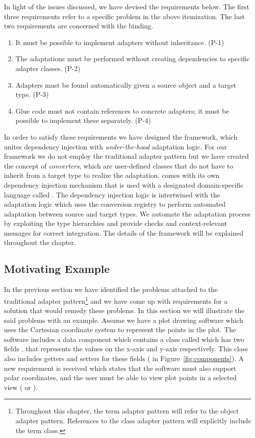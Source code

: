 In light of the issues discussed, we have devised the requirements below. The first three requirements refer to a specific problem in the above itemization. The last two requirements are concerned with the binding.

\begin{enumerate}[{R}-1]
\item It must be possible to implement adapters without inheritance. (P-1)
\item The adaptations must be performed without creating dependencies to specific adapter classes. (P-2)
\item Adapters must be found automatically given a source object and a target type. (P-3)
\item Glue code must not contain references to concrete adapters; it must be possible to implement these separately. (P-4)
\end{enumerate}

In order to satisfy these requirements we have designed the \zamk framework, which unites dependency injection with \emph{under-the-hood} adaptation logic.
For our framework we do not employ the traditional adapter pattern but we have created the concept of \emph{converters}, which are user-defined classes that do not have to inherit from a target type to realize the adaptation.
\zamk comes with its own dependency injection mechanism that is used with a designated domain-specific language called \gluer. 
The dependency injection logic is intertwined with the adaptation logic which uses the conversion registry to perform automated adaptation between source and target types. 
We automate the adaptation process by exploiting the type hierarchies and provide checks and context-relevant messages for correct integration. The details of the framework will be explained throughout the chapter.

\subsection{Motivating Example}
\label{sec:adapter:motiv}

In the previous section we have identified the problems attached to the traditional adapter pattern\footnote{Throughout this chapter, the term adapter pattern will refer to the object adapter pattern. References to the class adapter pattern will explicitly include the term class.} and we have come up with requirements for a solution that would remedy these problems. In this section we will illustrate the said problems with an example.
Assume we have a plot drawing software which uses the Cartesian coordinate system to represent the points in the plot. 
The software includes a data component which contains a class called  which has two fields , that represents the values on the x-axis and y-axis respectively. 
This class also includes getters and setters for these fields ( in Figure~\ref{fig:components}).
A new requirement is received which states that the software must also support polar coordinates, and the user must be able to view plot points in a selected view ( or ). 

